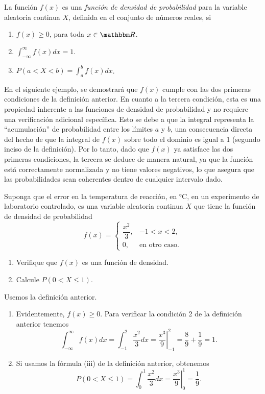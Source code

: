 \begin{definicion}{}{}
    La función $f(x)$ es una \emph{función de densidad de probabilidad} para la variable aleatoria continua $X$, definida en el conjunto de números reales, si
    \begin{enumerate}[label=\roman*), topsep=6pt, itemsep=0pt]
        \item $f(x) \geq 0$, para toda $x \in \RR$.
        \item $\displaystyle\int_{-\infty}^{\infty} f(x) dx = 1$.
        \item $\displaystyle P(a < X < b) = \int_a^b f(x) dx$.
    \end{enumerate}
\end{definicion}

En el siguiente ejemplo, se demostrará que $f(x)$ cumple con las dos primeras condiciones de la definición anterior. En cuanto a la tercera condición, esta es una propiedad inherente a las funciones de densidad de probabilidad y no requiere una verificación adicional específica. Esto se debe a que la integral representa la “acumulación” de probabilidad entre los límites $a$ y $b$, una consecuencia directa del hecho de que la integral de $f(x)$ sobre todo el dominio es igual a 1 (segundo inciso de la definición). Por lo tanto, dado que $f(x)$ ya satisface las dos primeras condiciones, la tercera se deduce de manera natural, ya que la función está correctamente normalizada y no tiene valores negativos, lo que asegura que las probabilidades sean coherentes dentro de cualquier intervalo dado.

\newpage

\begin{examplebox}{}{}
    Suponga que el error en la temperatura de reacción, en °C, en un experimento de laboratorio controlado, es una variable aleatoria continua $X$ que tiene la función de densidad de probabilidad
    $$f(x) = \begin{cases}
        \dfrac{x^2}{3}, & -1 < x < 2, \\[2mm]
        0, & \text{en otro caso}.
    \end{cases}$$
    \begin{enumerate}[label=\alph*), topsep=6pt, itemsep=0pt]
        \item Verifique que $f(x)$ es una función de densidad.
        \item Calcule $P(0 < X \leq 1)$.
    \end{enumerate}
    \tcblower
    \solucion Usemos la definición anterior.
    \begin{enumerate}[label=\alph*), topsep=6pt, itemsep=0pt]
        \item Evidentemente, $f(x) \geq 0$. Para verificar la condición 2 de la definición anterior tenemos
        $$\int_{-\infty}^{\infty} f(x) dx = \int_{-1}^{2} \frac{x^2}{3} dx = \left. \frac{x^3}{9} \right|_{-1}^{2} = \frac{8}{9} + \frac{1}{9} = 1.$$
        \item Si usamos la fórmula (iii) de la definición anterior, obtenemos
        $$P(0 < X \leq 1) = \int_{0}^{1} \frac{x^2}{3} dx = \left. \frac{x^3}{9} \right|_{0}^{1} = \frac{1}{9}.$$
    \end{enumerate}
\end{examplebox}

